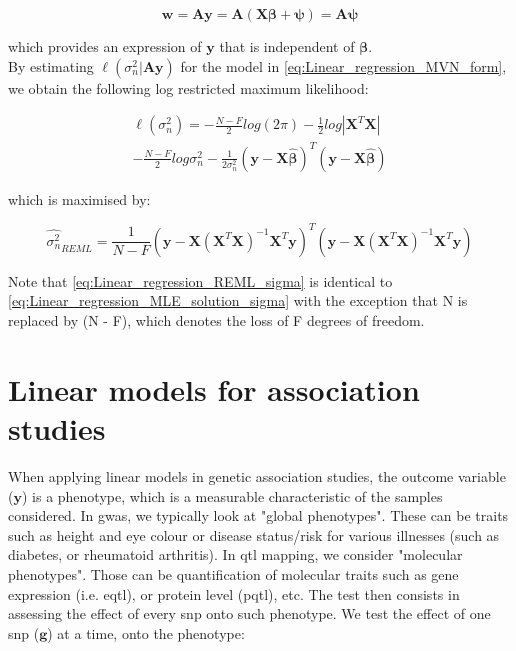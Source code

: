 \begin{equation}\label{eq:REML_w_projection}
    \mathbf{w} = \mathbf{A}\mathbf{y} = \mathbf{A}(\mathbf{X}\boldsymbol{\beta} + \boldsymbol{\psi}) = \mathbf{A}\boldsymbol{\psi}
\end{equation}

which provides an expression of $\mathbf{y}$ that is independent of $\boldsymbol{\beta}$.\\

By estimating $\ell(\sigma_n^2 | \mathbf{A}\mathbf{y} )$ for the model in \eqref{eq:Linear_regression_MVN_form}, we obtain the following log restricted maximum likelihood:

\begin{equation} \label{eq:Linear_regression_log_restricted_likelihood}
\begin{split}
\ell(\sigma_n^2) = -\frac{N-F}{2}log(2\pi) - \frac{1}{2}log|\mathbf{X}^T\mathbf{X}| \\
-  \frac{N-F}{2}log\sigma_n^2 - \frac{1}{2\sigma_n^2}(\mathbf{y}-\mathbf{X}\hat{\boldsymbol{\beta}})^T(\mathbf{y}-\mathbf{X}\hat{\boldsymbol{\beta}})  
\end{split}
\end{equation}

which is maximised by:

\begin{equation}\label{eq:Linear_regression_REML_sigma}
\hat{\sigma_n^2}_{REML} =  \frac{1}{N-F}(\mathbf{y}-\mathbf{X}(\mathbf{X}^T\mathbf{X})^{-1}\mathbf{X}^T\mathbf{y})^T(\mathbf{y}-\mathbf{X}(\mathbf{X}^T\mathbf{X})^{-1}\mathbf{X}^T\mathbf{y})
\end{equation}

Note that \eqref{eq:Linear_regression_REML_sigma} is identical to \eqref{eq:Linear_regression_MLE_solution_sigma} with the exception that N is replaced by (N - F), which denotes the loss of F degrees of freedom.


\section{Linear models for association studies}

When applying linear models in genetic association studies, the outcome variable ($\mathbf{y}$) is a phenotype, which is a measurable characteristic of the samples considered. 
In \gls{gwas}, we typically look at "global phenotypes".
These can be traits such as height and eye colour or disease status/risk for various illnesses (such as diabetes, or rheumatoid arthritis).
In \gls{qtl} mapping, we consider "molecular phenotypes". 
Those can be quantification of molecular traits such as gene expression (i.e. e\gls{qtl}), or protein level (p\gls{qtl}), etc.
The test then consists in assessing the effect of every \gls{snp}  onto such phenotype. 
We test the effect of one \gls{snp} ($\mathbf{g}$) at a time, onto the phenotype:

